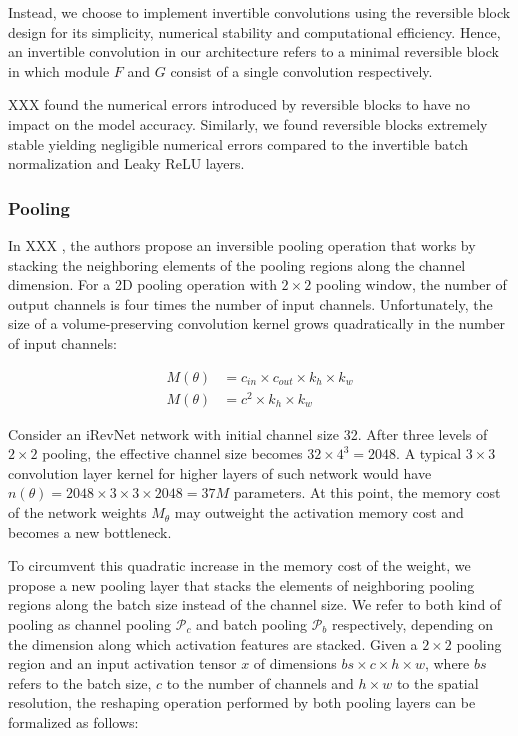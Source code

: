 \documentclass[twocolumn]{bmcart}
\begin{document}
Instead, we choose to implement invertible convolutions using the reversible block design for its simplicity, numerical stability and computational efficiency.
Hence, an invertible convolution in our architecture refers to a minimal reversible block in which module $F$ and $G$ consist of a single convolution respectively.

XXX \etal found the numerical errors introduced by reversible blocks to have no impact on the model accuracy. 
Similarly, we found reversible blocks extremely stable yielding negligible numerical errors 
compared to the invertible batch normalization and Leaky ReLU layers.

\subsubsection{Pooling}

In XXX \etal, the authors propose an inversible pooling operation that works by stacking the neighboring elements of the pooling regions along the channel dimension.
For a 2D pooling operation with $2 \times 2$ pooling window, the number of output channels is four times the number of input channels. 
Unfortunately, the size of a volume-preserving convolution kernel grows quadratically in the number of input channels:

\begin{subequations}
\begin{align}
M(\theta) &= c_{in} \times c_{out} \times k_h \times k_w \\
M(\theta) &= c^2 \times k_h \times k_w
\end{align}
\end{subequations}

Consider an iRevNet network with initial channel size 32.
After three levels of $2 \times 2$ pooling, the effective channel size becomes $32 \times 4^3=2048$. A typical $3 \times 3$ convolution layer kernel for higher layers of such network would have $n(\theta)=2048 \times 3 \times 3 \times 2048=37M$ parameters.
At this point, the memory cost of the network weights $M_{\theta}$ may outweight the activation memory cost and becomes a new bottleneck.

To circumvent this quadratic increase in the memory cost of the weight, we propose a new pooling layer that stacks the elements of neighboring pooling regions along the batch size instead of the channel size. We refer to both kind of pooling as channel pooling $\mathcal{P}_c$ and batch pooling $\mathcal{P}_b$ respectively, depending on the dimension along which activation features are stacked.
Given a $2 \times 2$ pooling region and an input activation tensor $x$ of dimensions $bs \times c \times h \times w$, where $bs$ refers to the batch size, $c$ to the number of channels and $h \times w$ to the spatial resolution, the reshaping operation performed by both pooling layers can be formalized as follows:
\end{document}
